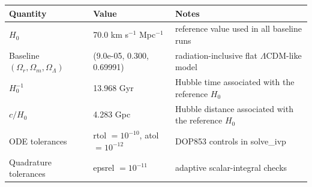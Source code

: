 \begin{tabularx}{\textwidth}{llX}
\toprule
Quantity & Value & Notes \\
\midrule
$H_0$ & 70.0 km s$^{-1}$ Mpc$^{-1}$ & reference value used in all baseline runs \\
Baseline $(\Omega_r,\Omega_m,\Omega_\Lambda)$ & (9.0e-05, 0.300, 0.69991) & radiation-inclusive flat $\Lambda$CDM-like model \\
$H_0^{-1}$ & 13.968 Gyr & Hubble time associated with the reference $H_0$ \\
$c/H_0$ & 4.283 Gpc & Hubble distance associated with the reference $H_0$ \\
ODE tolerances & rtol $=10^{-10}$, atol $=10^{-12}$ & DOP853 controls in solve\_ivp \\
Quadrature tolerances & epsrel $=10^{-11}$ & adaptive scalar-integral checks \\
\bottomrule
\end{tabularx}